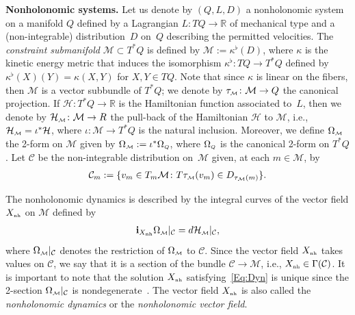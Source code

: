 \documentclass[10pt,a4paper]{amsart}
\numberwithin{equation}{section}
\def\M{\mathcal{M}}
\def\C{\mathcal{C}}
\def\Ham{\mathcal{H}}
\def\R{\mathbb{R}}
\def\nh{{\mbox{\tiny{nh}}}}
\def\subM{{\mbox{\tiny{$\M$}}}}
\def\subQQ{{\mbox{\tiny{$Q$}}}}
\begin{document}
{\bf Nonholonomic systems.} Let us denote by $(Q, L, D)$
a nonholonomic system on a manifold $Q$ def\/ined by a Lagrangian
$L\colon TQ\to \R$ of mechanical type and a (non-integrable) distribution~$D$ on~$Q$ describing the permitted velocities.
The {\it constraint submanifold} $\M\subset T^*Q$ is def\/ined by
$\M:=\kappa^\flat(D)$, where $\kappa$ is the kinetic energy metric
that induces the isomorphism $\kappa^\flat\colon TQ\to T^*Q$
def\/ined by $\kappa^\flat(X)(Y)= \kappa(X,Y)$ for $X,Y \in TQ$.
Note that since $\kappa$ is linear on the f\/ibers, then $\M$ is a vector subbundle of
$T^*Q$; we denote by $\tau_\subM\colon \M \to Q$ the canonical projection.
If $\Ham\colon T^*Q\to \R$ is the Hamiltonian function associated to~$L$,  then we denote
by $\Ham_\subM \colon \M \to R$ the pull-back of
the Hamiltonian $\Ham$ to $\M$, i.e., $\Ham_\subM = \iota^*\Ham$,
where $\iota \colon \M \to T^*Q$ is the natural inclusion.
Moreover, we def\/ine $\Omega_\subM$ the 2-form on $\M$ given by
$\Omega_\subM := \iota^*\Omega_\subQQ$, where $\Omega_\subQQ$ is the
canonical 2-form on $T^*Q$.
Let $\C$ be the non-integrable distribution on~$\M$ given, at each $m\in \M$, by
\begin{gather*}%
\C_m :=\{ v_m \in T_m\M \colon T\tau_\subM(v_m) \in D_{\tau_\M(m)} \}.
\end{gather*}

The nonholonomic dynamics is described by the integral curves of the vector
f\/ield $X_\nh$ on $\M$ def\/ined by
\begin{gather}\label{Eq:Dyn}
{\bf i}_{X_\nh} \Omega_\subM |_\C = d\Ham_\subM |_\C  ,
\end{gather}
where $\Omega_\subM|_\C$ denotes the restriction of $\Omega_\subM$ to $\C$.
Since the vector f\/ield $X_\nh$ takes
values on $\C$, we say that it is  a section of the bundle $\C\to\M$, i.e.,
$X_\nh\in \Gamma(\C)$.  It is important to note that the solution
$X_\nh$ satisfying~\eqref{Eq:Dyn} is unique since the 2-section $\Omega_\subM |_\C$
is nondegenerate~\cite{BS93}. The vector f\/ield $X_\nh$ is also called the {\it nonholonomic dynamics}
or the {\it nonholonomic vector field}.
\end{document}
